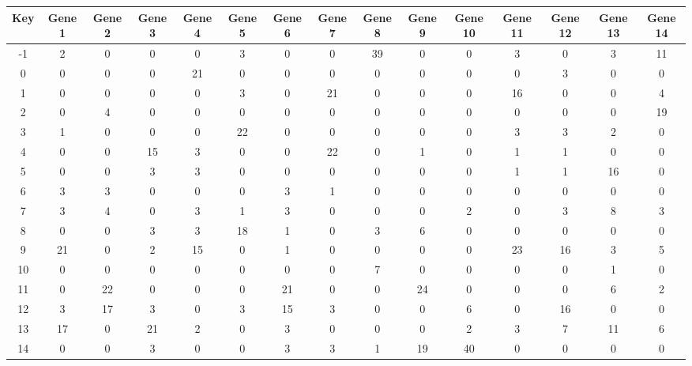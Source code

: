 \begin{tabular}{|c|c|c|c|c|c|c|c|c|c|c|c|c|c|c|}
\hline
Key & Gene 1 & Gene 2 & Gene 3 & Gene 4 & Gene 5 & Gene 6 & Gene 7 & Gene 8 & Gene 9 & Gene 10 & Gene 11 & Gene 12 & Gene 13 & Gene 14 \\
\hline
-1 & 2 & 0 & 0 & 0 & 3 & 0 & 0 & 39 & 0 & 0 & 3 & 0 & 3 & 11 \\
0 & 0 & 0 & 0 & 21 & 0 & 0 & 0 & 0 & 0 & 0 & 0 & 3 & 0 & 0 \\
1 & 0 & 0 & 0 & 0 & 3 & 0 & 21 & 0 & 0 & 0 & 16 & 0 & 0 & 4 \\
2 & 0 & 4 & 0 & 0 & 0 & 0 & 0 & 0 & 0 & 0 & 0 & 0 & 0 & 19 \\
3 & 1 & 0 & 0 & 0 & 22 & 0 & 0 & 0 & 0 & 0 & 3 & 3 & 2 & 0 \\
4 & 0 & 0 & 15 & 3 & 0 & 0 & 22 & 0 & 1 & 0 & 1 & 1 & 0 & 0 \\
5 & 0 & 0 & 3 & 3 & 0 & 0 & 0 & 0 & 0 & 0 & 1 & 1 & 16 & 0 \\
6 & 3 & 3 & 0 & 0 & 0 & 3 & 1 & 0 & 0 & 0 & 0 & 0 & 0 & 0 \\
7 & 3 & 4 & 0 & 3 & 1 & 3 & 0 & 0 & 0 & 2 & 0 & 3 & 8 & 3 \\
8 & 0 & 0 & 3 & 3 & 18 & 1 & 0 & 3 & 6 & 0 & 0 & 0 & 0 & 0 \\
9 & 21 & 0 & 2 & 15 & 0 & 1 & 0 & 0 & 0 & 0 & 23 & 16 & 3 & 5 \\
10 & 0 & 0 & 0 & 0 & 0 & 0 & 0 & 7 & 0 & 0 & 0 & 0 & 1 & 0 \\
11 & 0 & 22 & 0 & 0 & 0 & 21 & 0 & 0 & 24 & 0 & 0 & 0 & 6 & 2 \\
12 & 3 & 17 & 3 & 0 & 3 & 15 & 3 & 0 & 0 & 6 & 0 & 16 & 0 & 0 \\
13 & 17 & 0 & 21 & 2 & 0 & 3 & 0 & 0 & 0 & 2 & 3 & 7 & 11 & 6 \\
14 & 0 & 0 & 3 & 0 & 0 & 3 & 3 & 1 & 19 & 40 & 0 & 0 & 0 & 0 \\
\hline
\end{tabular}